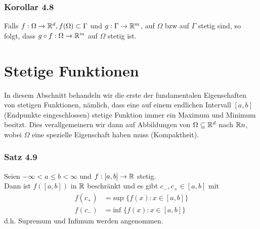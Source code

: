 \subsubsection*{Korollar 4.8}
Falls $f:\Omega \to \mathbb{R}^{d}, f(\Omega) \subset \Gamma$ und $g:\Gamma \to \mathbb{R}^{m}$, auf $\Omega$ bzw auf $\Gamma$ stetig sind, so folgt, dass $g\circ f:\Omega\to\mathbb{R}^{m}$ auf $\Omega$ stetig ist.
\section{Stetige Funktionen}
In diesem Abschnitt behandeln wir die erste der fundamentalen Eigenschaften von stetigen Funktionen, nämlich, dass eine auf einem endlichen Intervall $[a,b]$ (Endpunkte eingeschlossen) stetige Funktion immer ein Maximum und Minimum besitzt. Dies verallgemeinern wir dann auf Abbildungen von $\Omega\subseteq\mathbb{R}^{d}$ nach $\mathbb{R}{n}$, wobei $\Omega$ eine spezielle Eigenschaft haben muss (Kompaktheit).

\subsubsection*{Satz 4.9}
Seien $-\infty < a \leq b < \infty$ und $f:[a,b] \to \mathbb{R}$ stetig. \\
\noindent Dann ist $f([a,b])$ in $\mathbb{R}$ beschränkt und es gibt $c_{-}, c_{+} \in [a,b]$ mit \begin{align*} f(c_{+}) &= \text{sup } \{ f(x):x\in[a,b]\} \\ f(c_{-}) &= \text{inf }\{ f(x):x\in[a,b]\} \end{align*} d.h. Supremum und Infimum werden angenommen.

